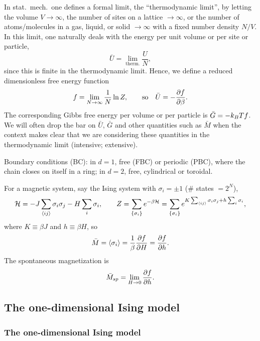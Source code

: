 In stat.\ mech.\ one defines a formal limit, the ``thermodynamic limit'', by letting the
volume $V\to\infty$, the number of sites on a lattice $\to\infty$, or the number of
atoms/molecules in a gas, liquid, or solid $\to\infty$ with a fixed number density $N/V$.
In this limit, one naturally deals with the energy per unit volume or per site or particle,
\begin{equation}
  \bar U = \lim_{\text{therm.}}\frac{U}{N},
\end{equation}
since this is finite in the thermodynamic limit. Hence, we define a reduced dimensionless
free energy function
\begin{equation}
  f = \lim_{N\to\infty}\frac{1}{N}\ln Z,\qquad\text{so}\quad \bar U = -\frac{\partial f}{\partial \beta}.
\end{equation}
The corresponding Gibbs free energy per volume or per particle is $\bar G = -k_{B} Tf$. We
will often drop the bar on $\bar U$, $\bar G$ and other quantities such as $\bar M$ when
the context makes clear that we are considering these quantities in the thermodynamic limit
(intensive; extensive).

Boundary conditions (BC): in $d = 1$, free (FBC) or periodic (PBC), where the chain
closes on itself in a ring; in $d = 2$, free, cylindrical or toroidal.

For a magnetic system, say the Ising system with $\sigma_i = \pm 1$ (\# states $= 2^N$),
\begin{equation}
  \mathcal{H} = -J\sum_{\langle ij\rangle}\sigma_i\sigma_j - H\sum_i\sigma_i,\qquad
  Z = \sum_{\{\sigma_i\}}e^{-\beta\mathcal{H}}
    = \sum_{\{\sigma_i\}}e^{K\sum_{\langle ij\rangle}\sigma_i\sigma_j + h\sum_i\sigma_i},
\end{equation}
where $K\equiv\beta J$ and $h\equiv\beta H$, so
\begin{equation}
  \bar M = \langle \sigma_i\rangle = \frac{1}{\beta}\frac{\partial f}{\partial H} = \frac{\partial f}{\partial h}.
\end{equation}
The spontaneous magnetization is
\begin{equation}
  \bar M_{sp} = \lim_{H\to 0}\frac{\partial f}{\partial h}.
\end{equation}

\subsection{The one-dimensional Ising model}
\subsubsection*{The one-dimensional Ising model}

